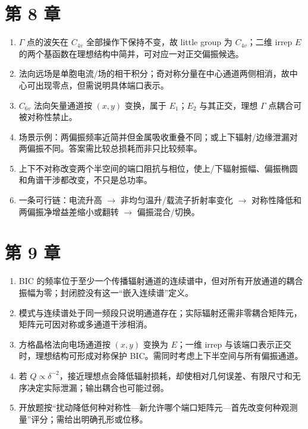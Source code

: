 \section{第 8 章}
\begin{enumerate}
  \item $\Gamma$ 点的波矢在 $C_{4v}$ 全部操作下保持不变，故 little group 为 $C_{4v}$；二维 irrep $E$ 的两个基函数在理想结构中简并，可对应一对正交偏振候选。
  \item 法向远场是单胞电流/场的相干积分；奇对称分量在中心通道两侧相消，故中心可出现零点，但需说明具体端口表示。
  \item $C_{6v}$ 法向矢量通道按 $(x,y)$ 变换，属于 $E_1$；$E_2$ 与其正交，理想 $\Gamma$ 点耦合可被对称性禁止。
  \item 场景示例：两偏振频率近简并但金属吸收重叠不同；或上下辐射/边缘泄漏对两偏振不同。答案需比较总损耗而非只比较频率。
  \item 上下不对称改变两个半空间的端口阻抗与相位，使上/下辐射振幅、偏振椭圆和角谱干涉都改变，不只是总功率。
  \item 一条可行链：电流升高 $\to$ 非均匀温升/载流子折射率变化 $\to$ 对称性降低和两偏振净增益差缩小或翻转 $\to$ 偏振混合/切换。
\end{enumerate}

\section{第 9 章}
\begin{enumerate}
  \item BIC 的频率位于至少一个传播辐射通道的连续谱中，但对所有开放通道的耦合振幅为零；封闭腔没有这一“嵌入连续谱”定义。
  \item 模式与连续谱处于同一频段只说明通道存在；实际辐射还需非零耦合矩阵元，矩阵元可因对称或多通道干涉相消。
  \item 方格晶格法向电场通道按 $(x,y)$ 变换为 $E$；一维 irrep 与该端口表示正交时，理想结构可形成对称保护 BIC。需同时考虑上下半空间与所有偏振通道。
  \item 若 $Q\propto\delta^{-2}$，接近理想点会降低辐射损耗，却使相对几何误差、有限尺寸和无序决定实际泄漏；输出耦合也可能过弱。
  \item 开放题按“扰动降低何种对称性—新允许哪个端口矩阵元—首先改变何种观测量”评分；需给出明确孔形或位移。
\end{enumerate}

